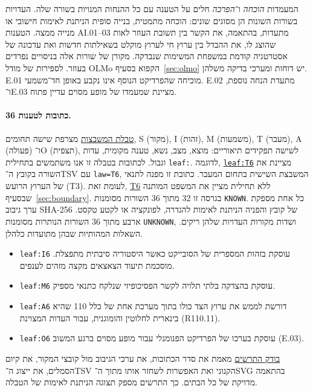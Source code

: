 \documentclass[11pt,a4paper]{article}
\DeclareRobustCommand{\textenglish}[1]{\foreignlanguage{english}{#1}}
\newcommand{\src}[2]{\href{https://github.com/Dnarts/rule110-dependency-fronts/blob/v2.2.1-monograph-multilingual/#1}{#2}}
\theoremstyle{definition}
\begin{document}
המעמדות \emph{הוכחה} ו־\emph{הפרכה} חלים על הטענה עם כל ההנחות המנויות בשורה שלה. העדויות בשורות השונות הן מסוגים שונים: הוכחה מתמטית, בנייה סופית הניתנת לאימות חישובי או מנייה ממצה. הטענות \textenglish{AI.01--03} מתעדות, בהתאמה, את הקשר בין תשובת העוזר לאות שהוצג לו, את ההבדל בין ערוץ חי לערוץ מוקלט בשאילתות חדשות ואת עדכונה של אסטרטגיה קודמת במשפחת המשימות שנבדקה. מקורן של שורות אלה בניסויים נפרדים בעוזר. לספירות של מודל \textenglish{OLMo} הקפוא בסעיף~\ref{sec:olmo} יש דוחות ומערכי בדיקה משלהן. \textenglish{E.01} מוכיחה שהפרדיקט הנוסף אינו נקבע באופן חד־משמעי. \textenglish{E.02} מתעדת הנחה נוספת, ו־\textenglish{E.03} מציינת שמעמדו של מופע מסוים עדיין פתוח.

\paragraph{36 כתובות לטענות.}
\src{observer/leaf/leaf.tsv}{טבלת המשבצות} מצרפת שישה תחומים, \textenglish{S} (מקור), \textenglish{I} (זהות), \textenglish{M} (משמעות), \textenglish{T} (מעבר), \textenglish{A} (פעולה) ו־\textenglish{O} (תצפית), לשישה תפקידים תיאוריים: מוצא, מצב, נשא, טענה מקומית, עדות וגבול. לכתובות בטבלה זו אנו משתמשים בתחילית \textenglish{\texttt{leaf:}}. לדוגמה, \src{observer/leaf/leaf.tsv\#L25}{\textenglish{\texttt{leaf:T6}}} מציינת את השורה בקובץ ה־\textenglish{TSV} עם \textenglish{\texttt{law=T6}}, המשבצת השישית בתחום המעבר. כתובת זו מפנה לתנאי של הערוץ הרועש (\textenglish{T3}). לעומת זאת, \hyperref[thm:conditional-bridge]{\textenglish{T6}} ללא תחילית מציין את המשפט המותנה שבסעיף~\ref{sec:boundary}. בגרסה זו 32 מתוך 36 השורות מסומנות \textenglish{\texttt{KNOWN}}. כל אחת מספקת ערך גיבוב \textenglish{SHA-256} של קובץ והפניה הניתנת לאימות להגדרה, לפונקציה או לקטע טקסט. ארבע מתוך 36 השורות הנותרות מסומנות \textenglish{\texttt{UNKNOWN}}, ושדות מקורות העדויות שלהן ריקים. השאלות המהותיות שבהן מתועדות כלהלן.
\begin{itemize}
\item \textenglish{\texttt{leaf:I6}} עוסקת בזהות המספרית של הסובייקט כאשר היסטוריה סיבתית מתפצלת. מוסכמת תיעוד הצאצאים מקצה מזהים לענפים.
\item \textenglish{\texttt{leaf:M6}} עוסקת בהצדקה בלתי תלויה לקשר הפסיכופיזי שנלקח כתנאי מספיק.
\item \textenglish{\texttt{leaf:A6}} דורשת לממש את ערוץ הצד כולו בתוך מערכת אחת של כלל 110 שהיא בינארית לחלוטין והומוגנית, עבור העדות המצוינת (\textenglish{R110.11}).
\item \textenglish{\texttt{leaf:O6}} עוסקת בערכו של הפרדיקט הפנומנלי עבור מופע מסוים ברגע המשוב (\textenglish{E.03}).
\end{itemize}
\src{observer/leaf/render_leaf.py}{בודק התרשים} מאמת את סדר הכתובות, את ערכי הגיבוב מול קובצי המקור, את קיום הסמלים, את ייצוג ה־\textenglish{TSV} הקנוני ואת האפשרות לשחזר אותו מתוך ה־\textenglish{SVG} בהתאמה מדויקת של כל הבתים. כך התרשים מספק תצוגה הניתנת לאימות של הטבלה.
\end{document}
